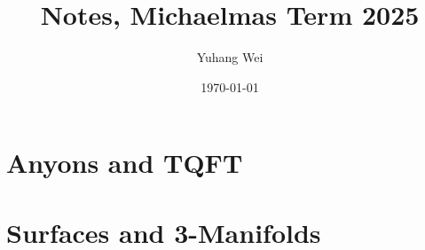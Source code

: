 \documentclass[11pt,a4paper]{book}
\theoremstyle{plain} %
\theoremstyle{definition} %
\theoremstyle{claimstyle}
\begin{document}
\title{Notes, Michaelmas Term 2025}
\author{Yuhang Wei}
\date{\today}
\maketitle
\tableofcontents


\chapter{Anyons and TQFT}




\chapter{Surfaces and 3-Manifolds}



\newpage
\printbibliography
\end{document}
